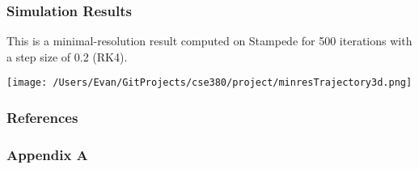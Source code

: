 \documentclass{beamer}
\begin{document}
\begin{frame}
\frametitle{Simulation Results}
This is a minimal-resolution result computed on Stampede for 500 iterations with a step size of 0.2 (RK4).

\texttt{[image: /Users/Evan/GitProjects/cse380/project/minresTrajectory3d.png]}
\end{frame}

\begin{frame}%
\frametitle{References}


\end{frame}


\appendix
\begin{frame}
\frametitle{Appendix A}

\end{frame}
\end{document}
